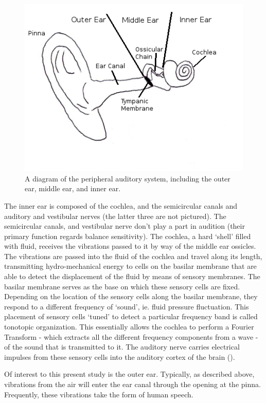 \begin{figure}[H]
\centering
  \includegraphics[width=.75\textwidth]{figure/ear-diagram.png}
  \caption{A diagram of the peripheral auditory system, including the outer ear, middle ear, and inner ear.}
  \label{fig:ear-anatomy}
\end{figure}

The inner ear is composed of the cochlea, and the semicircular canals and auditory and vestibular nerves (the latter three are not pictured).  The semicircular canals, and vestibular nerve don't play a part in audition (their primary function regards balance sensitivity).  The cochlea, a hard `shell' filled with fluid, receives the vibrations passed to it by way of the middle ear ossicles.%
The vibrations are passed into the fluid of the cochlea and travel along its length, transmitting hydro-mechanical energy to cells on the basilar membrane that are able to detect the displacement of the fluid by means of sensory membranes.  The basilar membrane serves as the base on which these sensory cells are fixed.  Depending on the location of the sensory cells along the basilar membrane, they respond to a different frequency of `sound', ie. fluid pressure fluctuation.  This placement of sensory cells `tuned' to detect a particular frequency band is called tonotopic organization.  This essentially allows the cochlea to perform a Fourier Transform - which extracts all the different frequency components from a wave - of the sound that is transmitted to it.  The auditory nerve carries electrical impulses from these sensory cells into the auditory cortex of the brain (\cite{rosen:91,celesia:15}). 

Of interest to this present study is the outer ear.  Typically, as described above, vibrations from the air will enter the ear canal through the opening at the pinna. Frequently, these vibrations take the form of human speech.


